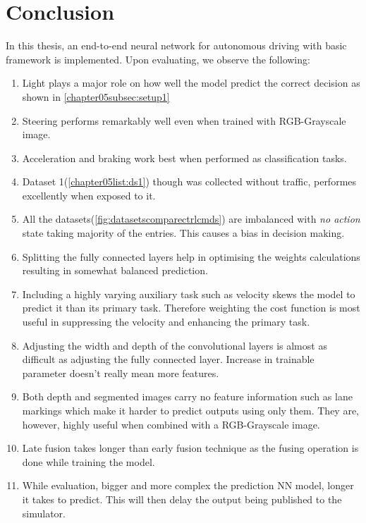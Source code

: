 \chapter{Conclusion}

In this thesis, an end-to-end neural network for autonomous driving with basic framework
is implemented. Upon evaluating, we observe the following:
\begin{enumerate}
    \item Light plays a major role on how well the model predict the correct decision as
        shown in \ref{chapter05subsec:setup1}
    \item Steering performs remarkably well even when trained with RGB-Grayscale image.
    \item Acceleration and braking work best when performed as classification tasks.
    \item Dataset 1(\ref{chapter05list:ds1}) though was collected without traffic,
        performes excellently when exposed to it.
    \item All the datasets(\ref{fig:datasetscomparectrlcmds}) are imbalanced with
        \textit{no action} state taking majority of the entries. This causes a bias in
        decision making.
    \item Splitting the fully connected layers help in optimising the weights calculations
        resulting in somewhat balanced prediction.
    \item Including a highly varying auxiliary task such as velocity skews the model to
        predict it than its primary task. Therefore weighting the cost function is most
        useful in suppressing the velocity and enhancing the primary task.
    \item Adjusting the width and depth of the convolutional layers is almost as difficult
        as adjusting the fully connected layer. Increase in trainable parameter doesn't
        really mean more features.
    \item Both depth and segmented images carry no feature information such as lane
        markings which make it harder to predict outputs using only them. They are,
        however, highly useful when combined with a RGB-Grayscale image.
    \item Late fusion takes longer than early fusion technique as the fusing operation is
        done while training the model.
    \item While evaluation, bigger and more complex the prediction NN model, longer it
        takes to predict. This will then delay the output being published to the
        simulator.
\end{enumerate}
